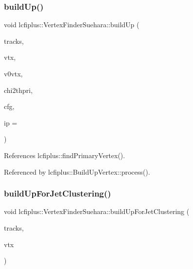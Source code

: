\subsubsection{build\+Up()}
{\footnotesize\ttfamily void lcfiplus\+::\+Vertex\+Finder\+Suehara\+::build\+Up (\begin{DoxyParamCaption}\item[{\textbf{ Track\+Vec} \&}]{tracks,  }\item[{vector$<$ \textbf{ Vertex} $\ast$$>$ \&}]{vtx,  }\item[{vector$<$ \textbf{ Vertex} $\ast$$>$ \&}]{v0vtx,  }\item[{double}]{chi2thpri,  }\item[{\textbf{ Vertex\+Finder\+Suehara\+Config} \&}]{cfg,  }\item[{\textbf{ Vertex} $\ast$$\ast$}]{ip = {} }\end{DoxyParamCaption})}



References lcfiplus\+::find\+Primary\+Vertex().



Referenced by lcfiplus\+::\+Build\+Up\+Vertex\+::process().

\mbox{\label{namespacelcfiplus_1_1VertexFinderSuehara_aca014441d6f9e7aecee5193452efc1f7}} 
\subsubsection{build\+Up\+For\+Jet\+Clustering()}
{\footnotesize\ttfamily void lcfiplus\+::\+Vertex\+Finder\+Suehara\+::build\+Up\+For\+Jet\+Clustering (\begin{DoxyParamCaption}\item[{\textbf{ Track\+Vec} \&}]{tracks,  }\item[{vector$<$ \textbf{ Vertex} $\ast$$>$ \&}]{vtx }\end{DoxyParamCaption})}

\mbox{\label{namespacelcfiplus_1_1VertexFinderSuehara_ae99678f83395c172d54f894849d3dce5}} 
